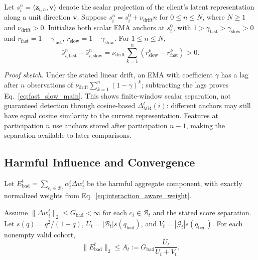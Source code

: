 \begin{lemma}
\label{lem:fast_slow_separation}
Let $s_i^n=\langle\mathbf{z}_{i,n},\mathbf{v}\rangle$ denote the scalar projection of the client's latent representation along a unit direction $\mathbf{v}$. Suppose $s_i^n=s_i^0+\nu_{\mathrm{drift}}n$ for $0\leq n\leq N$, where $N\geq1$ and $\nu_{\mathrm{drift}}>0$. Initialize both scalar EMA anchors at $s_i^0$, with $1>\gamma_{\mathrm{fast}}>\gamma_{\mathrm{slow}}>0$ and $r_{\mathrm{fast}}=1-\gamma_{\mathrm{fast}}$, $r_{\mathrm{slow}}=1-\gamma_{\mathrm{slow}}$. For $1\leq n\leq N$,
\begin{equation}
\bar{s}_{i,\mathrm{fast}}^n-\bar{s}_{i,\mathrm{slow}}^n=\nu_{\mathrm{drift}}\sum_{k=1}^{n}(r_{\mathrm{slow}}^k-r_{\mathrm{fast}}^k)>0.
\label{eq:fast_slow_main}
\end{equation}
\end{lemma}

\noindent\textit{Proof sketch.} Under the stated linear drift, an EMA with coefficient $\gamma$ has a lag after $n$ observations of $\nu_{\mathrm{drift}}\sum_{k=1}^{n}(1-\gamma)^k$; subtracting the lags proves Eq.~\eqref{eq:fast_slow_main}. This shows finite-window scalar separation, not guaranteed detection through cosine-based $\Delta_{\mathrm{MR}}^t(i)$: different anchors may still have equal cosine similarity to the current representation. Features at participation $n$ use anchors stored after participation $n-1$, making the separation available to later comparisons.

\subsection{Harmful Influence and Convergence}

Let $E_{\mathrm{bad}}^t=\sum_{c_i\in\mathcal{B}_t}\alpha_i^t\Delta w_i^t$ be the harmful aggregate component, with exactly normalized weights from Eq.~\eqref{eq:interaction_aware_weight}.

\begin{theorem}
\label{thm:bounded_harmful_influence}
Assume $\|\Delta w_i^t\|_2\leq G_{\mathrm{bad}}<\infty$ for each $c_i\in\mathcal{B}_t$ and the stated score separation. Let $s(q)=q^2/(1-q)$, $U_t=|\mathcal{B}_t|s(q_{\mathrm{bad}})$, and $V_t=|\mathcal{G}_t|s(q_{\mathrm{ben}})$. For each nonempty valid cohort,
\begin{equation}
\|E_{\mathrm{bad}}^t\|_2\leq A_t:=G_{\mathrm{bad}}\frac{U_t}{U_t+V_t}.
\label{eq:harmful_bound_main}
\end{equation}
\end{theorem}

